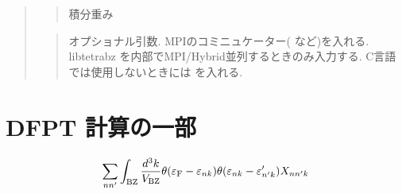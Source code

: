 \documentclass[letterpaper,10pt,dvipdfmx,openany]{sphinxmanual}
\begin{document}
\begin{quote}
\begin{quote}
\sphinxAtStartPar
積分重み
\end{quote}

\begin{sphinxVerbatim}[commandchars=\\\{\}]
\end{sphinxVerbatim}
\begin{quote}

\sphinxAtStartPar
オプショナル引数.
MPIのコミニュケーター(  など)を入れる.
libtetrabz を内部でMPI/Hybrid並列するときのみ入力する.
C言語では使用しないときには  を入れる.
\end{quote}
\end{quote}


\section{DFPT 計算の一部}
\label{\detokenize{routine:dfpt}}\begin{equation*}
\begin{split}\begin{align}
\sum_{n n'}
\int_{\rm BZ} \frac{d^3 k}{V_{\rm BZ}}
\theta(\varepsilon_{\rm F} -
\varepsilon_{n k}) \theta(\varepsilon_{n k} - \varepsilon'_{n' k})
X_{n n' k}
\end{align}\end{split}
\end{equation*}
\begin{sphinxVerbatim}[commandchars=\\\{\}]
\end{sphinxVerbatim}
\end{document}
